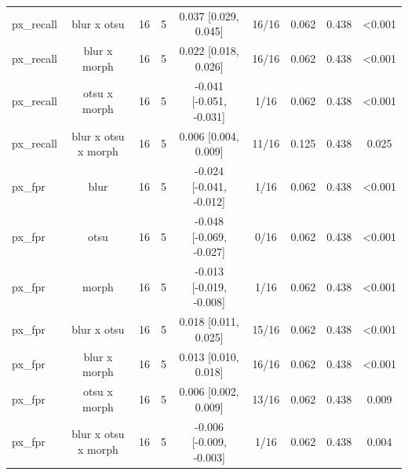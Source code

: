 \begin{table}[t]
\begin{tabular}{lcccccccc}
px\_recall & blur x otsu & 16 & 5 & 0.037 [0.029, 0.045] & 16/16 & 0.062 & 0.438 & <0.001 \\
px\_recall & blur x morph & 16 & 5 & 0.022 [0.018, 0.026] & 16/16 & 0.062 & 0.438 & <0.001 \\
px\_recall & otsu x morph & 16 & 5 & -0.041 [-0.051, -0.031] & 1/16 & 0.062 & 0.438 & <0.001 \\
px\_recall & blur x otsu x morph & 16 & 5 & 0.006 [0.004, 0.009] & 11/16 & 0.125 & 0.438 & 0.025 \\
px\_fpr & blur & 16 & 5 & -0.024 [-0.041, -0.012] & 1/16 & 0.062 & 0.438 & <0.001 \\
px\_fpr & otsu & 16 & 5 & -0.048 [-0.069, -0.027] & 0/16 & 0.062 & 0.438 & <0.001 \\
px\_fpr & morph & 16 & 5 & -0.013 [-0.019, -0.008] & 1/16 & 0.062 & 0.438 & <0.001 \\
px\_fpr & blur x otsu & 16 & 5 & 0.018 [0.011, 0.025] & 15/16 & 0.062 & 0.438 & <0.001 \\
px\_fpr & blur x morph & 16 & 5 & 0.013 [0.010, 0.018] & 16/16 & 0.062 & 0.438 & <0.001 \\
px\_fpr & otsu x morph & 16 & 5 & 0.006 [0.002, 0.009] & 13/16 & 0.062 & 0.438 & 0.009 \\
px\_fpr & blur x otsu x morph & 16 & 5 & -0.006 [-0.009, -0.003] & 1/16 & 0.062 & 0.438 & 0.004 \\
\bottomrule
\end{tabular}
\end{table}
